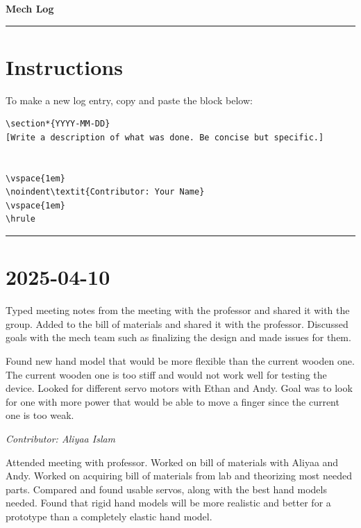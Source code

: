 \documentclass[12pt]{article}
\begin{document}
\begin{center}
    {\Huge\bfseries Mech Log}
\end{center}
\vspace{1em}
\hrule
\vspace{1em}


\section*{Instructions}
To make a new log entry, copy and paste the block below:


\begin{verbatim}
\section*{YYYY-MM-DD}
[Write a description of what was done. Be concise but specific.]


\vspace{1em}
\noindent\textit{Contributor: Your Name}
\vspace{1em}
\hrule
\end{verbatim}


\vspace{1em}
\hrule
\vspace{1em}




\section*{2025-04-10}
Typed meeting notes from the meeting with the professor and shared it with the group. Added to the bill of materials and shared it with the professor. Discussed goals with the mech team such as finalizing the design and made issues for them.


Found new hand model that would be more flexible than the current wooden one. The current wooden one is too stiff and would not work well for testing the device.
Looked for different servo motors with Ethan and Andy. Goal was to look for one with more power that would be able to move a finger since the current one is too weak.


\vspace{1em}
\noindent\textit{Contributor: Aliyaa Islam}
\vspace{1em}


Attended meeting with professor. Worked on bill of materials with Aliyaa and Andy. Worked on acquiring bill of materials from lab and theorizing most needed parts. Compared and found usable servos, along with the best hand models needed. Found that rigid hand models will be more realistic and better for a prototype than a completely elastic hand model.
\end{document}
